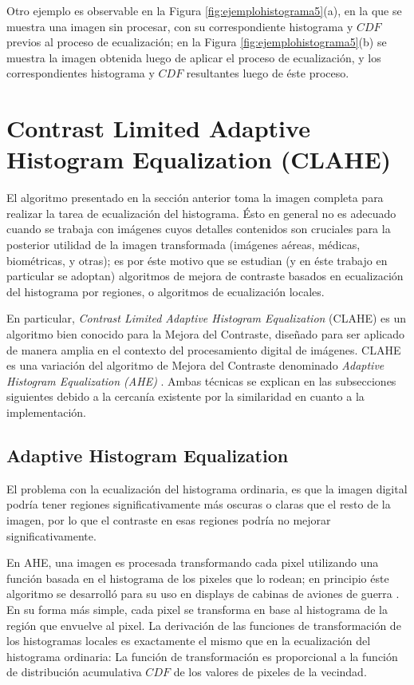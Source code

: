 Otro ejemplo es observable en la Figura \ref{fig:ejemplohistograma5}(a), en la que se muestra una imagen sin procesar, con su correspondiente histograma y $CDF$ previos al proceso de ecualización; en la Figura \ref{fig:ejemplohistograma5}(b) se muestra la imagen obtenida luego de aplicar el proceso de ecualización, y los correspondientes histograma y $CDF$ resultantes luego de éste proceso. 

\section{Contrast Limited Adaptive Histogram Equalization (CLAHE)}\label{sec:clahe}

El algoritmo presentado en la sección anterior toma la imagen completa para realizar la tarea de ecualización del histograma. Ésto en general no es adecuado cuando se trabaja con imágenes cuyos detalles contenidos son cruciales para la posterior utilidad de la imagen transformada \cite{sundaram2011histogram} (imágenes aéreas, médicas, biométricas, y otras); es por éste motivo que se estudian (y en éste trabajo en particular se adoptan) algoritmos de mejora de contraste basados en ecualización del histograma por regiones, o algoritmos de ecualización locales.

En particular, \textit{Contrast Limited Adaptive Histogram Equalization} (CLAHE) \cite{zuiderveld1994contrast} es un algoritmo bien conocido para la Mejora del Contraste, diseñado para ser aplicado de manera amplia en el contexto del procesamiento digital de imágenes. CLAHE es una variación del algoritmo de Mejora del Contraste denominado \textit{Adaptive Histogram Equalization (AHE)} \cite{pizer1987adaptive}. Ambas técnicas se explican en las subsecciones siguientes debido a la cercanía existente por la similaridad en cuanto a la implementación.

\subsection{Adaptive Histogram Equalization}\label{sec:definicionclahe}

El problema con la ecualización del histograma ordinaria, es que la imagen digital podría tener regiones significativamente más oscuras o claras que el resto de la imagen, por lo que el contraste en esas regiones podría no mejorar significativamente.

En AHE, una imagen es procesada transformando cada pixel utilizando una función basada en el histograma de los pixeles que lo rodean; en principio éste algoritmo se desarrolló para su uso en displays de cabinas de aviones de guerra \cite{ketcham1974image}. En su forma más simple, cada pixel se transforma en base al histograma de la región que envuelve al pixel. La derivación de las funciones de transformación de los histogramas locales es exactamente el mismo que en la ecualización del histograma ordinaria: La función de transformación es proporcional a la función de distribución acumulativa $CDF$ de los valores de pixeles de la vecindad. 

